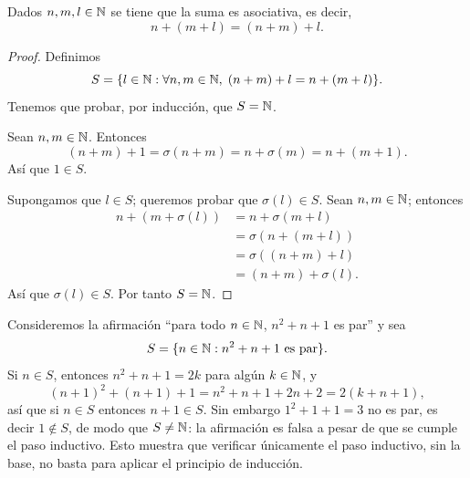 \documentclass[12pt,a4paper]{book}
\begin{document}
    \begin{proposicion}
        Dados $n,m,l \in \mathbb{N}$ se tiene que la suma es asociativa, es decir,
        \begin{equation*}
            n + (m+l) = (n+m)+l.
        \end{equation*}
    \end{proposicion}
    \begin{proof}
        Definimos
        \begin{equation*}
            S = \{l \in \mathbb{N} : \forall n,m \in \mathbb{N}, \; (n+m)+l = n+(m+l)\}.
        \end{equation*}
        Tenemos que probar, por inducción, que $S = \mathbb{N}$.

        Sean $n,m \in \mathbb{N}$. Entonces
        \begin{equation*}
            (n+m)+1 = \sigma(n+m) = n + \sigma(m) = n+(m+1).
        \end{equation*}
        Así que $1 \in S$.

        Supongamos que $l \in S$; queremos probar que $\sigma(l) \in S$. Sean $n,m \in \mathbb{N}$; entonces
        \begin{align*}
            n + (m + \sigma(l)) &= n + \sigma(m+l) \\
            &= \sigma(n+(m+l)) \\
            &= \sigma((n+m)+l) \\
            &= (n+m) + \sigma(l).
        \end{align*}
        Así que $\sigma(l) \in S$. Por tanto $S = \mathbb{N}$.
    \end{proof}

    \begin{ejemplo}
        Consideremos la afirmación ``para todo $n \in \mathbb{N}$, $n^2+n+1$ es par'' y sea
        \begin{equation*}
            S = \{n \in \mathbb{N} : n^2+n+1 \text{ es par}\}.
        \end{equation*}
        Si $n \in S$, entonces $n^2+n+1 = 2k$ para algún $k \in \mathbb{N}$, y
        \begin{equation*}
            (n+1)^2+(n+1)+1 = n^2+n+1+2n+2 = 2(k+n+1),
        \end{equation*}
        así que si $n \in S$ entonces $n+1 \in S$. Sin embargo $1^2+1+1=3$ no es par, es decir $1 \notin S$, de modo que $S \ne \mathbb{N}$: la afirmación es falsa a pesar de que se cumple el paso inductivo. Esto muestra que verificar únicamente el paso inductivo, sin la base, no basta para aplicar el principio de inducción.
    \end{ejemplo}
\end{document}
